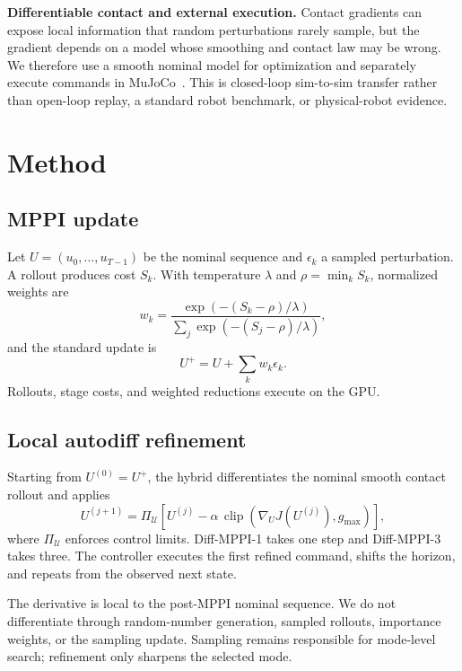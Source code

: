 \documentclass[conference]{IEEEtran}
\begin{document}
\textbf{Differentiable contact and external execution.}
Contact gradients can expose local information that random perturbations
rarely sample, but the gradient depends on a model whose smoothing and contact
law may be wrong.  We therefore use a smooth nominal model for optimization
and separately execute commands in MuJoCo~\cite{todorov2012mujoco}.  This is
closed-loop sim-to-sim transfer rather than open-loop replay, a standard robot
benchmark, or physical-robot evidence.

\section{Method}

\subsection{MPPI update}

Let \(U=(u_0,\ldots,u_{T-1})\) be the nominal sequence and
\(\epsilon_k\) a sampled perturbation.  A rollout produces cost \(S_k\).
With temperature \(\lambda\) and \(\rho=\min_k S_k\), normalized weights are
\begin{equation}
w_k =
\frac{\exp(-(S_k-\rho)/\lambda)}
     {\sum_j \exp(-(S_j-\rho)/\lambda)} ,
\end{equation}
and the standard update is
\begin{equation}
U^+ = U + \sum_k w_k\epsilon_k .
\end{equation}
Rollouts, stage costs, and weighted reductions execute on the GPU.

\subsection{Local autodiff refinement}

Starting from \(U^{(0)}=U^+\), the hybrid differentiates the nominal smooth
contact rollout and applies
\begin{equation}
U^{(j+1)} =
\Pi_{\mathcal U}\!\left[
U^{(j)}-\alpha\,
\operatorname{clip}\!\left(\nabla_U J(U^{(j)}),g_{\max}\right)
\right],
\end{equation}
where \(\Pi_{\mathcal U}\) enforces control limits.  Diff-MPPI-1 takes one step
and Diff-MPPI-3 takes three.  The controller executes the first refined
command, shifts the horizon, and repeats from the observed next state.

The derivative is local to the post-MPPI nominal sequence.  We do not
differentiate through random-number generation, sampled rollouts, importance
weights, or the sampling update.  Sampling remains responsible for mode-level
search; refinement only sharpens the selected mode.
\end{document}
